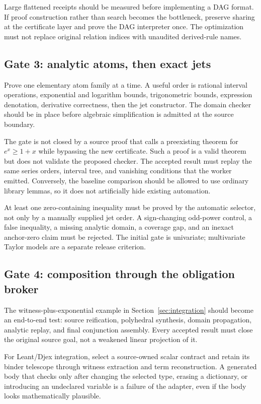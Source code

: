 Large flattened receipts should be measured before implementing a DAG format. If proof construction rather than search becomes the bottleneck, preserve sharing at the certificate layer and prove the DAG interpreter once. The optimization must not replace original relation indices with unaudited derived-rule names.

\subsection{Gate 3: analytic atoms, then exact jets}
Prove one elementary atom family at a time. A useful order is rational interval operations, exponential and logarithm bounds, trigonometric bounds, expression denotation, derivative correctness, then the jet constructor. The domain checker should be in place before algebraic simplification is admitted at the source boundary.

The gate is not closed by a source proof that calls a preexisting theorem for \(e^x\ge1+x\) while bypassing the new certificate. Such a proof is a valid theorem but does not validate the proposed checker. The accepted result must replay the same series orders, interval tree, and vanishing conditions that the worker emitted. Conversely, the baseline comparison should be allowed to use ordinary library lemmas, so it does not artificially hide existing automation.

At least one zero-containing inequality must be proved by the automatic selector, not only by a manually supplied jet order. A sign-changing odd-power control, a false inequality, a missing analytic domain, a coverage gap, and an inexact anchor-zero claim must be rejected. The initial gate is univariate; multivariate Taylor models are a separate release criterion.

\subsection{Gate 4: composition through the obligation broker}
The witness-plus-exponential example in Section~\ref{sec:integration} should become an end-to-end test: source reification, polyhedral synthesis, domain propagation, analytic replay, and final conjunction assembly. Every accepted result must close the original source goal, not a weakened linear projection of it.

For Leant/Djex integration, select a source-owned scalar contract and retain its binder telescope through witness extraction and term reconstruction. A generated body that checks only after changing the selected type, erasing a dictionary, or introducing an undeclared variable is a failure of the adapter, even if the body looks mathematically plausible.

